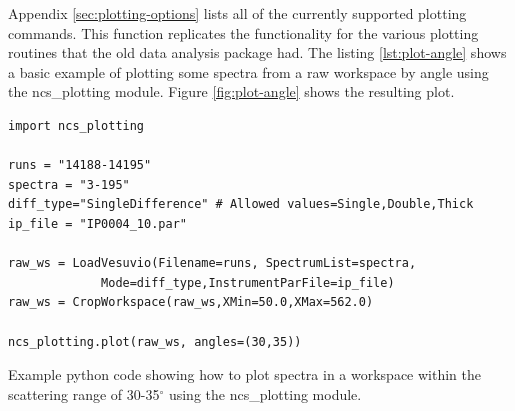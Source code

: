 \documentclass[paper=a4, fontsize=11pt]{scrartcl}	%
\numberwithin{equation}{section}															%
\numberwithin{figure}{section}																%
\numberwithin{table}{section}
\begin{document}
Appendix \ref{sec:plotting-options} lists all of the currently supported plotting commands. This function replicates the functionality for the various plotting routines that the old data analysis package had. The listing \ref{lst:plot-angle} shows a basic example of plotting some spectra from a raw workspace by angle using the ncs\_plotting module. Figure \ref{fig:plot-angle} shows the resulting plot.

\begin{listing}[H]
\begin{verbatim}
import ncs_plotting

runs = "14188-14195"
spectra = "3-195"
diff_type="SingleDifference" # Allowed values=Single,Double,Thick
ip_file = "IP0004_10.par"

raw_ws = LoadVesuvio(Filename=runs, SpectrumList=spectra,
		     Mode=diff_type,InstrumentParFile=ip_file)
raw_ws = CropWorkspace(raw_ws,XMin=50.0,XMax=562.0)

ncs_plotting.plot(raw_ws, angles=(30,35))
\end{verbatim}
\caption{Example python code showing how to plot spectra in a workspace within the scattering range of 30-35$^\circ$ using the ncs\_plotting module.}
\label{lst:plot-angle}
\end{listing}
\end{document}
